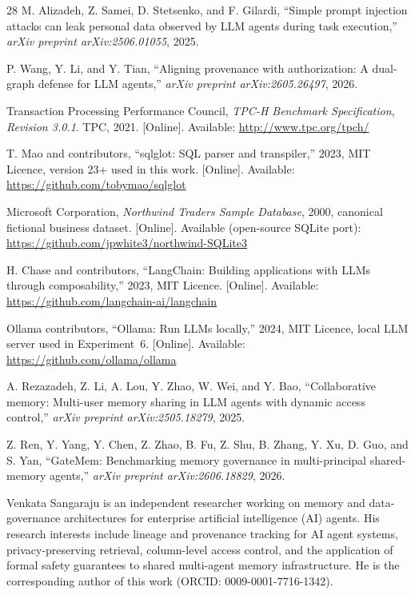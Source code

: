 \documentclass[nolineno]{ieeeaccess}
\begin{document}
\begin{thebibliography}{28}
M. Alizadeh, Z. Samei, D. Stetsenko, and F. Gilardi, ``Simple prompt
injection attacks can leak personal data observed by LLM agents during
task execution,'' \emph{arXiv preprint arXiv:2506.01055}, 2025.

P. Wang, Y. Li, and Y. Tian, ``Aligning provenance with authorization: A
dual-graph defense for LLM agents,'' \emph{arXiv preprint
arXiv:2605.26497}, 2026.

Transaction Processing Performance Council, \emph{TPC-H Benchmark
Specification, Revision 3.0.1}. TPC, 2021. [Online]. Available:
\url{http://www.tpc.org/tpch/}

T. Mao and contributors, ``sqlglot: SQL parser and transpiler,'' 2023,
MIT Licence, version 23+ used in this work. [Online]. Available:
\url{https://github.com/tobymao/sqlglot}

Microsoft Corporation, \emph{Northwind Traders Sample Database}, 2000,
canonical fictional business dataset. [Online]. Available (open-source
SQLite port): \url{https://github.com/jpwhite3/northwind-SQLite3}

H. Chase and contributors, ``LangChain: Building applications with LLMs
through composability,'' 2023, MIT Licence. [Online]. Available:
\url{https://github.com/langchain-ai/langchain}

Ollama contributors, ``Ollama: Run LLMs locally,'' 2024, MIT Licence,
local LLM server used in Experiment~6. [Online]. Available:
\url{https://github.com/ollama/ollama}

A. Rezazadeh, Z. Li, A. Lou, Y. Zhao, W. Wei, and Y. Bao, ``Collaborative
memory: Multi-user memory sharing in LLM agents with dynamic access
control,'' \emph{arXiv preprint arXiv:2505.18279}, 2025.

Z. Ren, Y. Yang, Y. Chen, Z. Zhao, B. Fu, Z. Shu, B. Zhang, Y. Xu, D. Guo,
and S. Yan, ``GateMem: Benchmarking memory governance in multi-principal
shared-memory agents,'' \emph{arXiv preprint arXiv:2606.18829}, 2026.

\end{thebibliography}

\vspace{6pt}

\begin{IEEEbiographynophoto}{Venkata Sangaraju}
is an independent researcher working on memory and data-governance
architectures for enterprise artificial intelligence (AI) agents. His
research interests include lineage and provenance tracking for AI agent
systems, privacy-preserving retrieval, column-level access control, and the
application of formal safety guarantees to shared multi-agent memory
infrastructure. He is the corresponding author of this work
(ORCID: 0009-0001-7716-1342).
\end{IEEEbiographynophoto}
\end{document}
